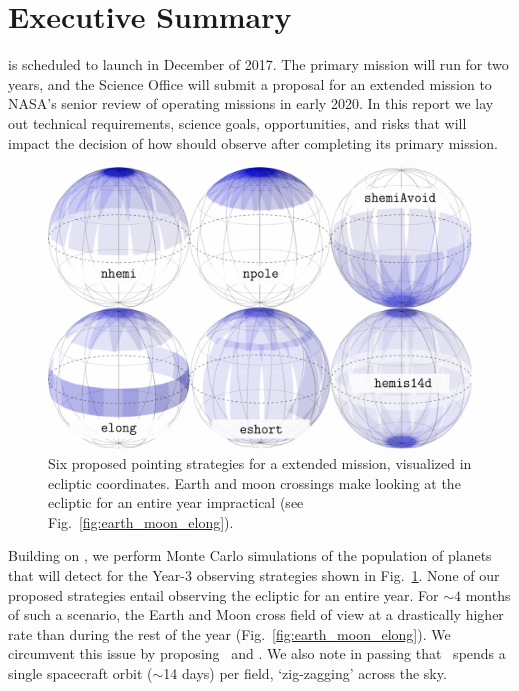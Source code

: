 \newpage
\section{Executive Summary}

\tess is scheduled to launch in December of 2017.
The primary mission will run for two years, and the \tess Science Office will submit a proposal for an extended mission to NASA's senior review of operating missions in early 2020.
In this report we lay out technical requirements, science goals, opportunities, and risks that will impact the decision of how \tess should observe after completing its primary mission.

\begin{figure}[!b]
	\includegraphics{figures/proposed_pointings_texttt.pdf}
	\caption{Six proposed pointing strategies for a \tess extended mission, visualized in ecliptic coordinates. %
	Earth and moon crossings make looking at the ecliptic for an entire year impractical (see Fig.~\protect\ref{fig:earth_moon_elong}).}
	\label{fig:strategies}
\end{figure}
Building on \citet{Sullivan_2015}, we perform Monte Carlo simulations of the population of planets that \tess will detect for the Year-3 observing strategies shown in Fig.~\ref{fig:strategies}.
None of our proposed strategies entail observing the ecliptic for an entire year.
For $\sim\!4$ months of such a scenario, the Earth and Moon cross \tesss field of view at a drastically higher rate than during the rest of the year (Fig.~\ref{fig:earth_moon_elong}).
We circumvent this issue by proposing \elong\ and \eshort.
We also note in passing that \hemis\ spends a single spacecraft orbit ($\sim$14 days) per field, `zig-zagging' across the sky.


